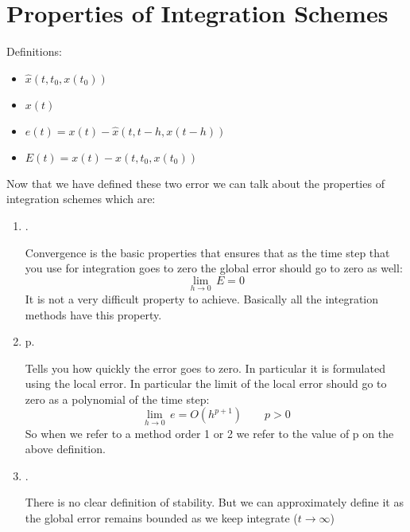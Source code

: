 \section{Properties of Integration Schemes}
Definitions:
\begin{itemize}
\item{ $\hat{x}(t, t_0, x(t_0))$}
\item{ $x(t)$}
\item{ $e(t) = x(t) - \hat{x}(t, t-h, x(t-h))$}
\item{ $E(t) = x(t) - \hat{x}(t, t_0, x(t_0))$ }
\end{itemize}
Now that we have defined these two error we can talk about the properties of integration schemes which are:
\begin{enumerate}
\item {}.

Convergence is the basic properties that ensures that as the time step that you use for integration goes to zero the global error should go to zero as well:
\[\lim_{h\to0} \,E = 0\]
It is not a very difficult property to achieve. Basically all the integration methods have this property.
\item {} p.

Tells you how quickly the error goes to zero. In particular it is formulated using the local error.
In particular the limit of the local error should go to zero as a polynomial of the time step:
\[\lim_{h\to0}\,e=O(h^{p+1})\qquad p>0\]
So when we refer to a method order 1 or 2 we refer to the value of p on the above definition.
\item {}.

There is no clear definition of stability.  But we can approximately define it as the global error remains bounded as we keep integrate ($t\to\infty$)
\end{enumerate}

